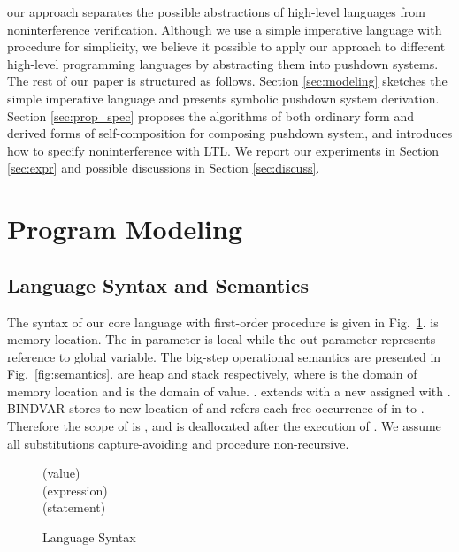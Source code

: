 \documentclass{llncs}
\begin{document}
our approach separates the possible abstractions of high-level
languages from noninterference verification. Although we use a
simple imperative language with procedure for simplicity, we believe
it possible to apply our approach to different high-level
programming
languages by abstracting them into pushdown systems.\\
\indent The rest of our paper is structured as follows. Section
\ref{sec:modeling} sketches the simple imperative language and
presents symbolic pushdown system derivation. Section
\ref{sec:prop_spec} proposes the algorithms of both ordinary form
and derived forms of self-composition for composing pushdown system,
and introduces how to specify noninterference with LTL. We report
our experiments in Section \ref{sec:expr} and possible discussions
in Section \ref{sec:discuss}.

\section{\label{sec:modeling}Program Modeling}
\subsection{\label{subsec:language}Language Syntax and Semantics}

The syntax of our core language with first-order procedure is given
in Fig.~\ref{fig:syntex}.  is memory location. The \textsf{in}
parameter is local while the \textsf{out} parameter represents
reference to global variable. The big-step operational semantics are
presented in Fig.~\ref{fig:semantics}.  are heap and stack respectively, where
 is the domain of memory location and  is
the domain of value. .
 extends  with a new
 assigned with . BINDVAR stores  to new location  of
 and refers each free occurrence of  in  to .
Therefore the scope of  is , and  is deallocated after the
execution of . We assume all substitutions capture-avoiding and
procedure  non-recursive.

\begin{figure}[t]
\parbox[t]{4.8in}{\footnotesize
\hfill(value)\\
\hspace*{\fill}(expression)\\
\hspace*{\fill}(statement)}
\caption{\label{fig:syntex}Language Syntax}
\end{figure}
\end{document}
